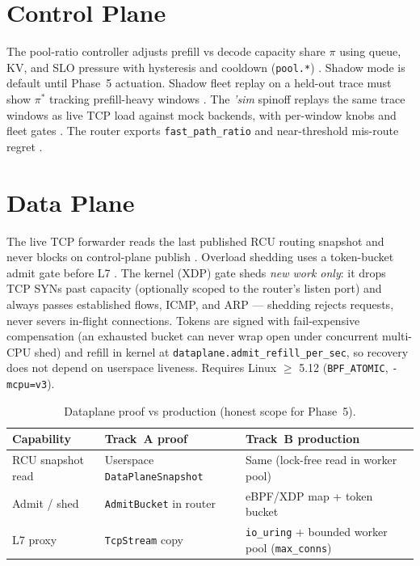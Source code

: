 \documentclass[11pt]{article}
\begin{document}
\section{Control Plane}\label{sec:control}
The pool-ratio controller adjusts prefill vs decode capacity share
$\pi$ using queue, KV, and SLO pressure with hysteresis and cooldown
(\texttt{pool.*}) . Shadow mode is default until Phase~5
actuation. Shadow fleet replay on a held-out trace must show $\pi^*$ tracking
prefill-heavy windows . The \emph{'sim} spinoff replays
the same trace windows as live TCP load against mock backends, with per-window
knobs and fleet gates . The router exports
\texttt{fast\_path\_ratio} and near-threshold mis-route regret
.

\section{Data Plane}\label{sec:dataplane}
The live TCP forwarder reads the last published RCU routing snapshot and never
blocks on control-plane publish . Overload shedding uses a
token-bucket admit gate before L7 . The kernel (XDP) gate
sheds \emph{new work only}: it drops TCP SYNs past capacity (optionally scoped
to the router's listen port) and always passes established flows, ICMP, and
ARP --- shedding rejects requests, never severs in-flight connections. Tokens
are signed with fail-expensive compensation (an exhausted bucket can never wrap
open under concurrent multi-CPU shed) and refill in kernel at
\texttt{dataplane.admit\_refill\_per\_sec}, so recovery does not depend on
userspace liveness. Requires Linux $\geq$ 5.12 (\texttt{BPF\_ATOMIC},
\texttt{-mcpu=v3}).

\begin{table}[h]
  \centering
  \small
  \begin{tabular}{lll}
    \toprule
    Capability & Track~A proof & Track~B production \\
    \midrule
    RCU snapshot read & Userspace \texttt{DataPlaneSnapshot} & Same (lock-free read in worker pool) \\
    Admit / shed & \texttt{AdmitBucket} in router & eBPF/XDP map + token bucket \\
    L7 proxy & \texttt{TcpStream} copy & \texttt{io\_uring} + bounded worker pool (\texttt{max\_conns}) \\
    \bottomrule
  \end{tabular}
  \caption{Dataplane proof vs production (honest scope for Phase~5).}
  \label{tab:dataplane}
\end{table}
\end{document}
